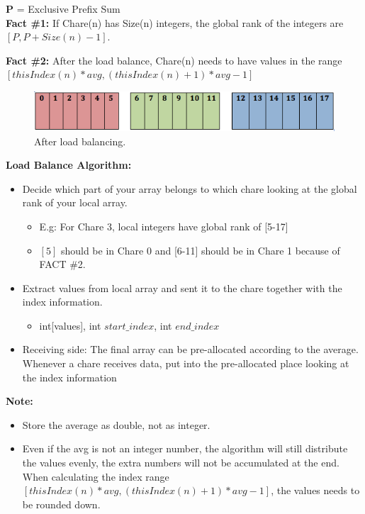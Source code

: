 \documentclass{article}
\begin{document}
\textbf{P} = Exclusive Prefix Sum \\

\textbf{Fact \#1:}
If Chare(n) has Size(n) integers, the global rank of the integers are $[P, P+Size(n)-1]$.

\textbf{Fact \#2:}
After the load balance, Chare(n) needs to have values in the range 
$[thisIndex(n)*avg, (thisIndex(n)+1)*avg-1]$\\

\begin{figure}[h]
\centering
\includegraphics[width=\textwidth]{after_balance.png}
\caption{After load balancing.}
\label{prefix}
\end{figure}


\textbf{ Load Balance Algorithm: }
\begin{itemize}
\item Decide which part of your array belongs to which chare looking at the global rank of your local array.
\begin{itemize}
\item E.g: For Chare 3, local integers have global rank of [5-17]
\item $[5]$ should be in Chare 0 and [6-11] should be in Chare 1 because of FACT \#2.
\end{itemize}
\item Extract values from local array and sent it to the chare together with the index information. 
\begin{itemize}
\item int[values], int $start\_index$, int $end\_index$
\end{itemize}


\item Receiving side: The final array can be pre-allocated according to the average. Whenever a chare receives data, put into the pre-allocated place looking at the index information

\end{itemize}



\textbf{Note:}
\begin{itemize}
\item Store the average as double, not as integer.
\item Even if the avg is not an integer number, the algorithm will still distribute the values evenly, the extra numbers will not be accumulated at the end.
When calculating the index range $[thisIndex(n)*avg, (thisIndex(n)+1)*avg-1]$, the values needs to be rounded down.\\
\end{itemize}
\end{document}
